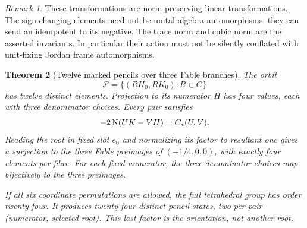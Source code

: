 \documentclass[11pt]{article}
\newtheorem{theorem}{Theorem}[section]
\theoremstyle{remark}\newtheorem{remark}[theorem]{Remark}
\begin{document}
\begin{remark}
These transformations are norm-preserving linear transformations. The sign-changing elements need not be unital algebra automorphisms: they can send an idempotent to its negative. The trace norm and cubic norm are the asserted invariants. In particular their action must not be silently conflated with unit-fixing Jordan frame automorphisms.
\end{remark}

\begin{theorem}[Twelve marked pencils over three Fable branches]\label{thm:twelve}
The orbit
\[
 \mathcal P=\{(RH_0,RK_0):R\in G\}
\]
has twelve distinct elements. Projection to its numerator $H$ has four values, each with three denominator choices. Every pair satisfies
\[
 -2\operatorname{N}(UK-VH)=C_*(U,V).
\]
Reading the root in fixed slot $e_0$ and normalizing its factor to resultant one gives a surjection to the three Fable preimages of $(-1/4,0,0)$, with exactly four elements per fibre. For each fixed numerator, the three denominator choices map bijectively to the three preimages.

If all six coordinate permutations are allowed, the full tetrahedral group has order twenty-four. It produces twenty-four distinct pencil states, two per pair (numerator, selected root). This last factor is the orientation, not another root.
\end{theorem}
\end{document}

